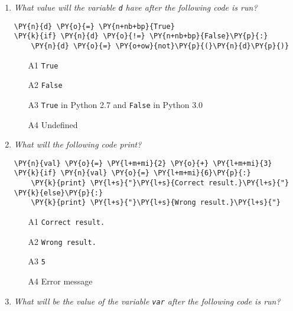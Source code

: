 \begin{enumerate}
\item {\em What value will the variable {\tt d} have after the following code is run?}\\

\begin{Verbatim}[commandchars=\\\{\}]
\PY{n}{d} \PY{o}{=} \PY{n+nb+bp}{True}
\PY{k}{if} \PY{n}{d} \PY{o}{!=} \PY{n+nb+bp}{False}\PY{p}{:}
    \PY{n}{d} \PY{o}{=} \PY{o+ow}{not}\PY{p}{(}\PY{n}{d}\PY{p}{)}
\end{Verbatim}
\vspace{6mm}

\begin{enumerate}
\item[A1] {\tt True}
\item[A2] {\tt False}
\item[A3] {\tt True} in Python 2.7 and {\tt False} in Python 3.0
\item[A4] Undefined
\end{enumerate}

\vspace{6mm}

\item {\em What will the following code print?}\\

\begin{Verbatim}[commandchars=\\\{\}]
\PY{n}{val} \PY{o}{=} \PY{l+m+mi}{2} \PY{o}{+} \PY{l+m+mi}{3}
\PY{k}{if} \PY{n}{val} \PY{o}{=} \PY{l+m+mi}{6}\PY{p}{:}
    \PY{k}{print} \PY{l+s}{"}\PY{l+s}{Correct result.}\PY{l+s}{"}
\PY{k}{else}\PY{p}{:}
    \PY{k}{print} \PY{l+s}{"}\PY{l+s}{Wrong result.}\PY{l+s}{"}
\end{Verbatim}
\vspace{6mm}

\begin{enumerate}
\item[A1] {\tt Correct result.}
\item[A2] {\tt Wrong result.}
\item[A3] {\tt 5}
\item[A4] Error message
\end{enumerate}

\vspace{6mm}

\item {\em What will be the value of the variable {\tt var} after the following code is run?}\\


\end{enumerate}
